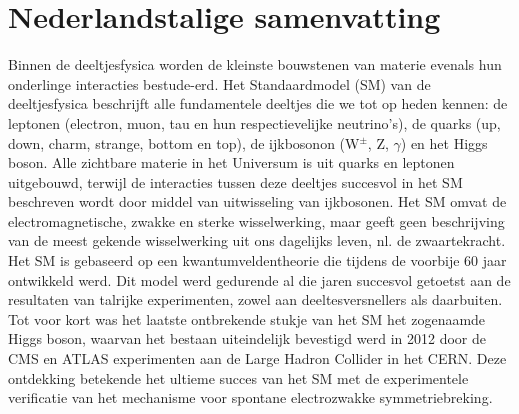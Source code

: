 \graphicspath{{chapt_dutch/}{intro/}{chapt2/}{chapt3/}{chapt4/}{chapt5/}{chapt6/}{chapt7/}}
\renewcommand{\thesection}{\arabic{section}}    %

\renewcommand\evenpagerightmark{{\scshape\small Chapter 9}}
\renewcommand\oddpageleftmark{{\scshape\small Nederlandstalige samenvatting}}

\chapter[Nederlandstalige samenvatting]%
{Nederlandstalige samenvatting}

\hyphenation{}
\def\hyph{-\penalty0\hskip0pt\relax}

Binnen de deeltjesfysica worden de kleinste bouwstenen van materie evenals hun
onderlinge interacties bestude-erd. %
Het Standaardmodel (SM) van de
deeltjesfysica beschrijft alle fundamentele deeltjes die we tot op heden
kennen: de leptonen (electron, muon, tau en hun respectievelijke neutrino's),
de quarks (up, down, charm, strange, bottom en top), de ijkbosonon (W$^\pm$,
Z, $\gamma$) en het Higgs boson. Alle zichtbare
materie in het Universum is uit quarks en leptonen uitgebouwd, terwijl de
interacties tussen deze deeltjes succesvol in het SM beschreven wordt door middel van
uitwisseling van ijkbosonen.  
Het SM omvat de electromagnetische,
zwakke en sterke wisselwerking, maar geeft geen beschrijving van de meest
gekende wisselwerking uit ons dagelijks leven, nl. de zwaartekracht.  
Het SM is gebaseerd op een
kwantumveldentheorie die tijdens de voorbije 60 jaar ontwikkeld werd. Dit
model werd gedurende al die jaren succesvol getoetst aan de resultaten van
talrijke experimenten, zowel aan 
deeltesversnellers als daarbuiten. 
Tot voor kort was het laatste ontbrekende stukje van het SM het
zogenaamde Higgs boson, waarvan het bestaan uiteindelijk 
bevestigd werd in 2012 door de CMS en ATLAS
experimenten aan de Large Hadron Collider in het CERN. Deze ontdekking betekende
het ultieme succes van het SM met de experimentele  
verificatie van het mechanisme voor spontane electrozwakke symmetriebreking. 


